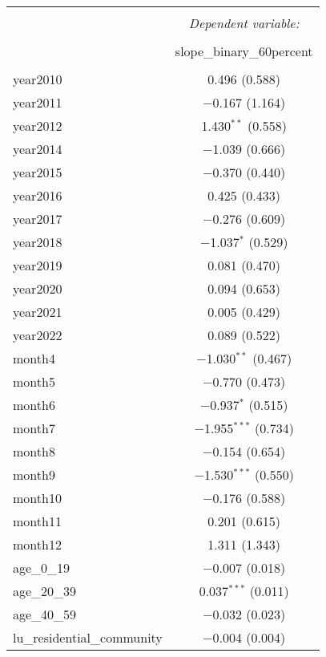 \begin{table}[!htbp] \centering 
  \caption{} 
  \label{} 
\small 
\begin{tabular}{@{\extracolsep{1pt}}lc} 
\\[-1.8ex]\hline 
\hline \\[-1.8ex] 
 & \multicolumn{1}{c}{\textit{Dependent variable:}} \\ 
\cline{2-2} 
\\[-1.8ex] & slope\_binary\_60percent \\ 
\hline \\[-1.8ex] 
 year2010 & 0.496 (0.588) \\ 
  year2011 & $-$0.167 (1.164) \\ 
  year2012 & 1.430$^{**}$ (0.558) \\ 
  year2014 & $-$1.039 (0.666) \\ 
  year2015 & $-$0.370 (0.440) \\ 
  year2016 & 0.425 (0.433) \\ 
  year2017 & $-$0.276 (0.609) \\ 
  year2018 & $-$1.037$^{*}$ (0.529) \\ 
  year2019 & 0.081 (0.470) \\ 
  year2020 & 0.094 (0.653) \\ 
  year2021 & 0.005 (0.429) \\ 
  year2022 & 0.089 (0.522) \\ 
  month4 & $-$1.030$^{**}$ (0.467) \\ 
  month5 & $-$0.770 (0.473) \\ 
  month6 & $-$0.937$^{*}$ (0.515) \\ 
  month7 & $-$1.955$^{***}$ (0.734) \\ 
  month8 & $-$0.154 (0.654) \\ 
  month9 & $-$1.530$^{***}$ (0.550) \\ 
  month10 & $-$0.176 (0.588) \\ 
  month11 & 0.201 (0.615) \\ 
  month12 & 1.311 (1.343) \\ 
  age\_0\_19 & $-$0.007 (0.018) \\ 
  age\_20\_39 & 0.037$^{***}$ (0.011) \\ 
  age\_40\_59 & $-$0.032 (0.023) \\ 
  lu\_residential\_community & $-$0.004 (0.004) \\ 

\end{tabular}
\end{table}
